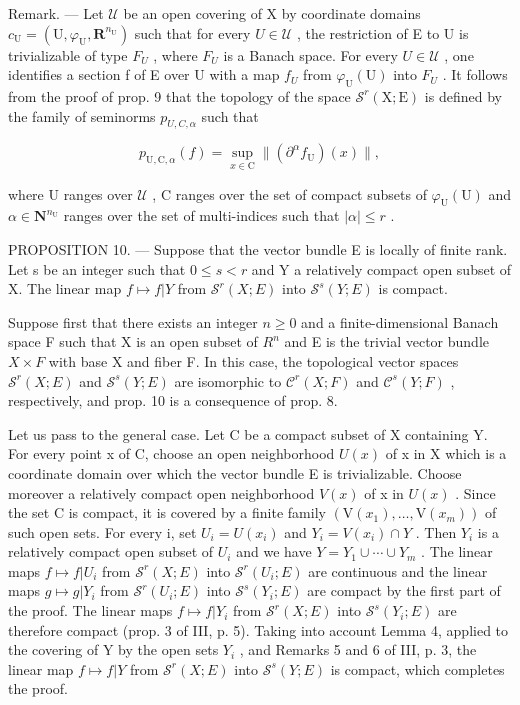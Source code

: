 Remark. --- Let \(\mathcal{U}\) be an open covering of X by coordinate domains \(c_{\mathrm{U}} = (\mathrm{U}, \varphi_{\mathrm{U}}, \mathbf{R}^{n_{\mathrm{U}}})\) such that for every \(U \in \mathcal{U}\) , the restriction of E to U is trivializable of type \(F_{U}\) , where \(F_{U}\) is a Banach space. For every \(U \in \mathcal{U}\) , one identifies a section f of E over U with a map \(f_{U}\) from \(\varphi_{\mathrm{U}}(\mathrm{U})\) into \(F_{U}\) . It follows from the proof of prop. 9 that the topology of the space \(\mathcal{S}^{r}(\mathrm{X};\mathrm{E})\) is defined by the family of seminorms \(p_{U,C,\alpha}\) such that

\[
p _ {\mathrm{U,C}, \alpha} (f) = \sup _ {x \in \mathrm{C}} \| (\partial^ {\alpha} f _ {\mathrm{U}}) (x) \|,
\]

where U ranges over \(\mathcal{U}\) , C ranges over the set of compact subsets of \(\varphi_{\mathrm{U}}(\mathrm{U})\) and \(\alpha \in \mathbf{N}^{n_{\mathrm{U}}}\) ranges over the set of multi-indices such that \(|\alpha| \leqslant r\) .

PROPOSITION 10. --- Suppose that the vector bundle E is locally of finite rank. Let s be an integer such that \(0 \leqslant s < r\) and Y a relatively compact open subset of X. The linear map \(f \mapsto f|Y\) from \(\mathcal{S}^{r}(X;E)\) into \(\mathcal{S}^{s}(Y;E)\) is compact.

Suppose first that there exists an integer \(n \geqslant 0\) and a finite-dimensional Banach space F such that X is an open subset of \(R^{n}\) and E is the trivial vector bundle \(X \times F\) with base X and fiber F. In this case, the topological vector spaces \(\mathcal{S}^{r}(X;E)\) and \(\mathcal{S}^{s}(Y;E)\) are isomorphic to \(\mathcal{C}^{r}(X;F)\) and \(\mathcal{C}^{s}(Y;F)\) , respectively, and prop. 10 is a consequence of prop. 8.

Let us pass to the general case. Let C be a compact subset of X containing Y. For every point x of C, choose an open neighborhood \(U(x)\) of x in X which is a coordinate domain over which the vector bundle E is trivializable. Choose moreover a relatively compact open neighborhood \(V(x)\) of x in \(U(x)\) . Since the set C is compact, it is covered by a finite family \((\mathrm{V}(x_{1}),\ldots,\mathrm{V}(x_{m}))\) of such open sets. For every i, set \(U_{i}=U(x_{i})\) and \(Y_{i}=V(x_{i})\cap Y\) . Then \(Y_{i}\) is a relatively compact open subset of \(U_{i}\) and we have \(Y=Y_{1}\cup\cdots\cup Y_{m}\) . The linear maps \(f\mapsto f|U_{i}\) from \(\mathcal{S}^{r}(X;E)\) into \(\mathcal{S}^{r}(U_{i};E)\) are continuous and the linear maps \(g\mapsto g|Y_{i}\) from \(\mathcal{S}^{r}(U_{i};E)\) into \(\mathcal{S}^{s}(Y_{i};E)\) are compact by the first part of the proof. The linear maps \(f\mapsto f|Y_{i}\) from \(\mathcal{S}^{r}(X;E)\) into \(\mathcal{S}^{s}(Y_{i};E)\) are therefore compact (prop. 3 of III, p. 5). Taking into account Lemma 4, applied to the covering of Y by the open sets \(Y_{i}\) , and Remarks 5 and 6 of III, p. 3, the linear map \(f\mapsto f|Y\) from \(\mathcal{S}^{r}(X;E)\) into \(\mathcal{S}^{s}(Y;E)\) is compact, which completes the proof.

